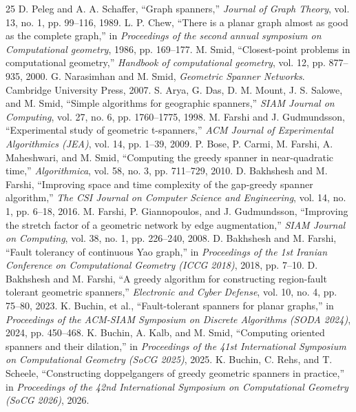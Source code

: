 \documentclass[journal]{IEEEtran}
\begin{document}
\begin{thebibliography}{25}
D. Peleg and A. A. Schaffer, ``Graph spanners,'' \textit{Journal of Graph Theory}, vol. 13, no. 1, pp. 99--116, 1989.
L. P. Chew, ``There is a planar graph almost as good as the complete graph,'' in \textit{Proceedings of the second annual symposium on Computational geometry}, 1986, pp. 169--177.
M. Smid, ``Closest-point problems in computational geometry,'' \textit{Handbook of computational geometry}, vol. 12, pp. 877--935, 2000.
G. Narasimhan and M. Smid, \textit{Geometric Spanner Networks}. Cambridge University Press, 2007.
S. Arya, G. Das, D. M. Mount, J. S. Salowe, and M. Smid, ``Simple algorithms for geographic spanners,'' \textit{SIAM Journal on Computing}, vol. 27, no. 6, pp. 1760--1775, 1998.
M. Farshi and J. Gudmundsson, ``Experimental study of geometric t-spanners,'' \textit{ACM Journal of Experimental Algorithmics (JEA)}, vol. 14, pp. 1--39, 2009.
P. Bose, P. Carmi, M. Farshi, A. Maheshwari, and M. Smid, ``Computing the greedy spanner in near-quadratic time,'' \textit{Algorithmica}, vol. 58, no. 3, pp. 711--729, 2010.
D. Bakhshesh and M. Farshi, ``Improving space and time complexity of the gap-greedy spanner algorithm,'' \textit{The CSI Journal on Computer Science and Engineering}, vol. 14, no. 1, pp. 6--18, 2016.
M. Farshi, P. Giannopoulos, and J. Gudmundsson, ``Improving the stretch factor of a geometric network by edge augmentation,'' \textit{SIAM Journal on Computing}, vol. 38, no. 1, pp. 226--240, 2008.
D. Bakhshesh and M. Farshi, ``Fault tolerancy of continuous Yao graph,'' in \textit{Proceedings of the 1st Iranian Conference on Computational Geometry (ICCG 2018)}, 2018, pp. 7--10.
D. Bakhshesh and M. Farshi, ``A greedy algorithm for constructing region-fault tolerant geometric spanners,'' \textit{Electronic and Cyber Defense}, vol. 10, no. 4, pp. 75--80, 2023.
K. Buchin, et al., ``Fault-tolerant spanners for planar graphs,'' in \textit{Proceedings of the ACM-SIAM Symposium on Discrete Algorithms (SODA 2024)}, 2024, pp. 450--468.
K. Buchin, A. Kalb, and M. Smid, ``Computing oriented spanners and their dilation,'' in \textit{Proceedings of the 41st International Symposium on Computational Geometry (SoCG 2025)}, 2025.
K. Buchin, C. Rehs, and T. Scheele, ``Constructing doppelgangers of greedy geometric spanners in practice,'' in \textit{Proceedings of the 42nd International Symposium on Computational Geometry (SoCG 2026)}, 2026.

\end{thebibliography}
\end{document}
